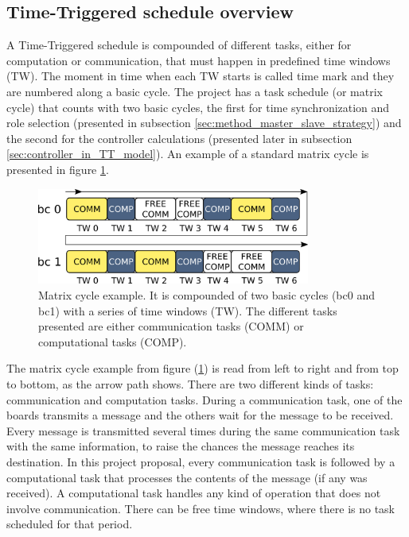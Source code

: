 \documentclass[table,xcdraw]{article}
\begin{document}
\subsection{Time-Triggered schedule overview}

A Time-Triggered schedule is compounded of different tasks, either for computation or communication, that must happen in predefined time windows (TW). The moment in time when each TW starts is called time mark and they are numbered along a basic cycle. The project has a task schedule (or matrix cycle) that counts with two basic cycles, the first for time synchronization and role selection (presented in subsection \ref{sec:method_master_slave_strategy}) and the second for the controller calculations (presented later in subsection \ref{sec:controller_in_TT_model}). An example of a standard matrix cycle is presented in figure \ref{fig:matrix_cycle_example}. 

\begin{figure}[h!]
    \centering
    \includegraphics[width=0.8\textwidth]{figures/methodology/matrix_cycle_example.png}
    \caption{Matrix cycle example. It is compounded of two basic cycles (bc0 and bc1) with a series of time windows (TW). The different tasks presented are either communication tasks (COMM) or computational tasks (COMP).}
    \label{fig:matrix_cycle_example}
\end{figure}

The matrix cycle example from figure (\ref{fig:matrix_cycle_example}) is read from left to right and from top to bottom, as the arrow path shows. There are two different kinds of tasks: communication and computation tasks. During a communication task, one of the boards transmits a message and the others wait for the message to be received. Every message is transmitted several times during the same communication task with the same information, to raise the chances the message reaches its destination. In this project proposal, every communication task is followed by a computational task that processes the contents of the message (if any was received). A computational task handles any kind of operation that does not involve communication. There can be free time windows, where there is no task scheduled for that period.\\
\end{document}

